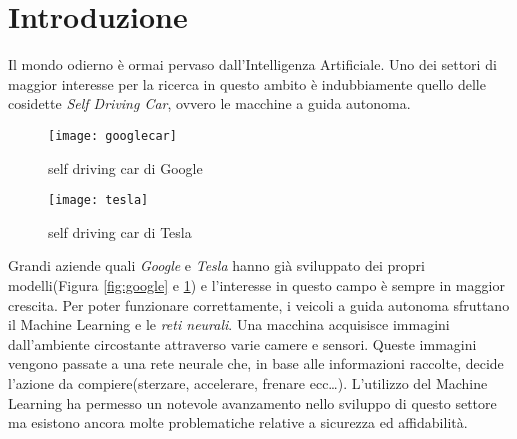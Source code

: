 \chapter*{Introduzione}
Il mondo odierno è ormai pervaso dall'Intelligenza Artificiale. Uno dei settori di maggior interesse per la
ricerca in questo ambito è indubbiamente quello delle cosidette \emph{Self Driving Car}, ovvero
le macchine a guida autonoma. 
\begin{figure}
  \centering
  \parbox{5cm}{
  \texttt{[image: googlecar]}
  \caption{self driving car di Google}
  \label{fig:google}}
  \qquad
  \begin{minipage}{5cm}
  \texttt{[image: tesla]}
  \caption{self driving car di Tesla}
  \label{fig:tesla}
  \end{minipage}
  \end{figure}
Grandi aziende quali \emph{Google} e \emph{Tesla} hanno già sviluppato
dei propri modelli(Figura \ref{fig:google} e \ref{fig:tesla}) e l'interesse in questo campo è sempre in  maggior crescita. Per poter funzionare correttamente, i veicoli a guida autonoma sfruttano il Machine Learning e le \emph{reti neurali}. Una macchina acquisisce immagini
dall'ambiente circostante attraverso varie camere e sensori. Queste immagini vengono passate a una rete neurale che, in base alle informazioni raccolte, decide l'azione da compiere(sterzare, accelerare, frenare ecc\dots).
L'utilizzo del Machine Learning ha permesso un notevole avanzamento nello sviluppo di questo settore ma  esistono ancora molte problematiche relative a sicurezza ed affidabilità.\\

